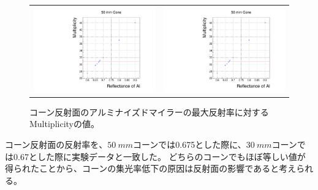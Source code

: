 \begin{figure}
  \begin{tabular}{cc}
    \begin{minipage}{0.45\hsize}
      \centering
      \includegraphics[keepaspectratio, scale=0.35, page=1]{images/chapter4/decideAl.pdf}
    \end{minipage} &
    \begin{minipage}{0.45\hsize}
      \centering
      \includegraphics[keepaspectratio, scale=0.35, page=2]{images/chapter4/decideAl.pdf}
    \end{minipage}
  \end{tabular}
  \caption{コーン反射面のアルミナイズドマイラーの最大反射率に対するMultiplicityの値。}
  \label{fig:decideAl}
\end{figure}

コーン反射面の反射率を、$\SI{50}{mm}$コーンでは0.675とした際に、$\SI{30}{mm}$コーンでは0.67とした際に実験データと一致した。
どちらのコーンでもほぼ等しい値が得られたことから、コーンの集光率低下の原因は反射面の影響であると考えられる。